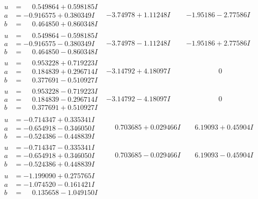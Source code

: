 \documentclass[1p]{elsarticle_modified}
\theoremstyle{definition}
\begin{document}
$$\begin{array}{c|c|c}
\begin{aligned}
u &= \phantom{-}0.549864 + 0.598185 I \\
a &= -0.916575 + 0.380349 I \\
b &= \phantom{-}0.464850 + 0.860348 I\end{aligned}
 & -3.74978 + 1.11248 I & -1.95186 - 2.77586 I \\ \hline\begin{aligned}
u &= \phantom{-}0.549864 - 0.598185 I \\
a &= -0.916575 - 0.380349 I \\
b &= \phantom{-}0.464850 - 0.860348 I\end{aligned}
 & -3.74978 - 1.11248 I & -1.95186 + 2.77586 I \\ \hline\begin{aligned}
u &= \phantom{-}0.953228 + 0.719223 I \\
a &= \phantom{-}0.184839 + 0.296714 I \\
b &= \phantom{-}0.377691 - 0.510927 I\end{aligned}
 & -3.14792 + 4.18097 I & \phantom{-0.000000 } 0 \\ \hline\begin{aligned}
u &= \phantom{-}0.953228 - 0.719223 I \\
a &= \phantom{-}0.184839 - 0.296714 I \\
b &= \phantom{-}0.377691 + 0.510927 I\end{aligned}
 & -3.14792 - 4.18097 I & \phantom{-0.000000 } 0 \\ \hline\begin{aligned}
u &= -0.714347 + 0.335341 I \\
a &= -0.654918 - 0.346050 I \\
b &= -0.524386 - 0.448839 I\end{aligned}
 & \phantom{-}0.703685 + 0.029466 I & \phantom{-}6.19093 + 0.45904 I \\ \hline\begin{aligned}
u &= -0.714347 - 0.335341 I \\
a &= -0.654918 + 0.346050 I \\
b &= -0.524386 + 0.448839 I\end{aligned}
 & \phantom{-}0.703685 - 0.029466 I & \phantom{-}6.19093 - 0.45904 I \\ \hline\begin{aligned}
u &= -1.199090 + 0.275765 I \\
a &= -1.074520 - 0.161421 I \\
b &= \phantom{-}0.135658 - 1.049150 I\end{aligned}

\end{array}$$
\end{document}

